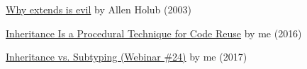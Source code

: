\documentclass{article}
\begin{document}


\href{https://www.infoworld.com/article/2073649/why-extends-is-evil.html}{Why extends is evil} by Allen Holub (2003)

\href{https://www.yegor256.com/2016/09/13/inheritance-is-procedural.html}{Inheritance Is a Procedural Technique for Code Reuse} by me (2016)

\href{https://www.youtube.com/watch?v=DjrA7_Uymok}{Inheritance vs. Subtyping (Webinar \#24)} by me (2017)
\end{document}
